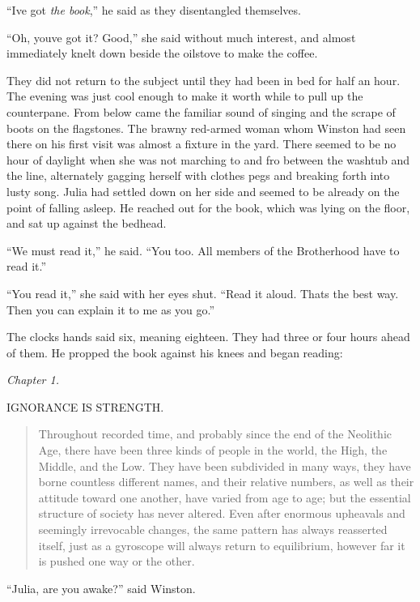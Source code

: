 ``I\textquotesingle ve got \emph{the book},'' he said as they disentangled
themselves.

``Oh, you\textquotesingle ve got it? Good,'' she said without much
interest, and almost immediately knelt down beside the oilstove to make
the coffee.

They did not return to the subject until they had been in bed for half
an hour. The evening was just cool enough to make it worth while to pull
up the counterpane. From below came the familiar sound of singing and
the scrape of boots on the flagstones. The brawny red-armed woman whom
Winston had seen there on his first visit was almost a fixture in the
yard. There seemed to be no hour of daylight when she was not marching
to and fro between the washtub and the line, alternately gagging herself
with clothes pegs and breaking forth into lusty song. Julia had settled
down on her side and seemed to be already on the point of falling
asleep. He reached out for the book, which was lying on the floor, and
sat up against the bedhead.

``We must read it,'' he said. ``You too. All members of the Brotherhood
have to read it.''

``You read it,'' she said with her eyes shut. ``Read it aloud.
That\textquotesingle s the best way. Then you can explain it to me as
you go.''

The clock\textquotesingle s hands said six, meaning eighteen. They had
three or four hours ahead of them. He propped the book against his knees
and began reading:
\begin{center}
\emph{Chapter 1.}

IGNORANCE IS STRENGTH.
\end{center}

\begin{quotation}
Throughout recorded time, and probably since the end of the Neolithic
Age, there have been three kinds of people in the world, the High, the
Middle, and the Low. They have been subdivided in many ways, they have
borne countless different names, and their relative numbers, as well as
their attitude toward one another, have varied from age to age; but the
essential structure of society has never altered. Even after enormous
upheavals and seemingly irrevocable changes, the same pattern has always
reasserted itself, just as a gyroscope will always return to
equilibrium, however far it is pushed one way or the other.
\end{quotation}

``Julia, are you awake?'' said Winston.

